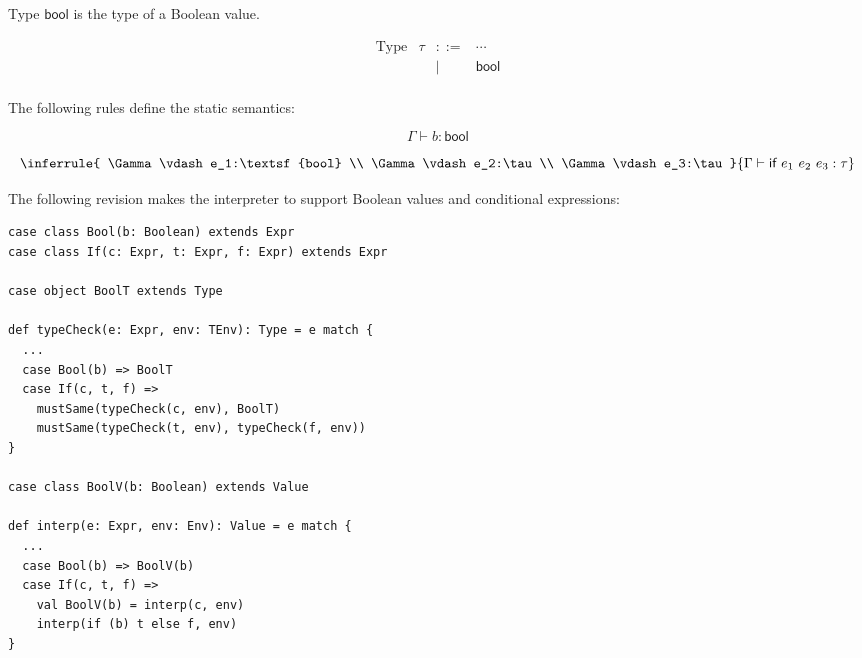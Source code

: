 Type $\textsf{bool}$ is the type of a Boolean value.

\[
\begin{array}{lrcl}
\text{Type} & \tau & ::= & \cdots \\
&& | & \textsf{bool} \\
\end{array}
\]

The following rules define the static semantics:

\[
{ \Gamma\vdash b:\textsf{bool} }
\]

\[
\inferrule
{
  \Gamma\vdash e_1:\textsf{bool} \\
  \Gamma\vdash e_2:\tau \\
  \Gamma\vdash e_3:\tau
}
{ \Gamma\vdash \textsf{if}\ e_1\ e_2\ e_3:\tau }
\]

The following revision makes the interpreter to support Boolean values and
conditional expressions:

\begin{verbatim}
case class Bool(b: Boolean) extends Expr
case class If(c: Expr, t: Expr, f: Expr) extends Expr

case object BoolT extends Type

def typeCheck(e: Expr, env: TEnv): Type = e match {
  ...
  case Bool(b) => BoolT
  case If(c, t, f) =>
    mustSame(typeCheck(c, env), BoolT)
    mustSame(typeCheck(t, env), typeCheck(f, env))
}

case class BoolV(b: Boolean) extends Value

def interp(e: Expr, env: Env): Value = e match {
  ...
  case Bool(b) => BoolV(b)
  case If(c, t, f) =>
    val BoolV(b) = interp(c, env)
    interp(if (b) t else f, env)
}
\end{verbatim}

